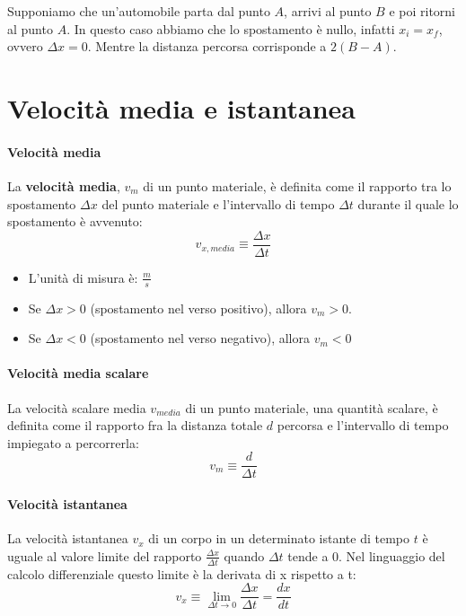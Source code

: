 \documentclass[a4paper,11pt,oneside]{book}
\begin{document}
Supponiamo che un'automobile parta dal punto $A$, arrivi al punto $B$ e poi ritorni al punto $A$. In questo caso abbiamo che lo spostamento
è nullo, infatti $x_i = x_f$, ovvero $\Delta x = 0$. Mentre la distanza percorsa corrisponde a $2 (B-A)$.

\section{Velocità media e istantanea}

\paragraph{Velocità media}
La \textbf{velocità media}, $v_{m}$ di un punto materiale, è definita come il rapporto tra lo spostamento $\Delta x$ del punto materiale
e l’intervallo di tempo $\Delta t$ durante il quale lo spostamento è avvenuto:
\begin{equation*}
    v_{x,media} \equiv \frac{\Delta x}{\Delta t}
\end{equation*}

\begin{itemize}
    \item L'unità di misura è: $\frac{m}{s}$
    \item Se $\Delta x > 0$ (spostamento nel verso positivo), allora $v_m > 0$.
    \item Se $\Delta x < 0$ (spostamento nel verso negativo), allora $v_m < 0$
\end{itemize}

\paragraph{Velocità media scalare}
La velocità scalare media $v_{media}$ di un punto materiale, una quantità scalare, è definita come il rapporto
fra la distanza totale $d$ percorsa e l’intervallo di tempo impiegato a percorrerla:
\begin{equation*}
    v_{m} \equiv \frac{d}{\Delta t}
\end{equation*}

\paragraph{Velocità istantanea}
La velocità istantanea $v_x$ di un corpo in un determinato istante di tempo $t$ è uguale al valore limite del rapporto $\frac{\Delta x}{\Delta t}$
quando $\Delta t$ tende a $0$. Nel linguaggio del calcolo differenziale questo limite è la derivata di x rispetto a t:
\begin{equation*}
    v_x \equiv \lim_{\Delta t \to 0} \frac{\Delta x}{\Delta t} = \frac{dx}{dt}
\end{equation*}
\end{document}
